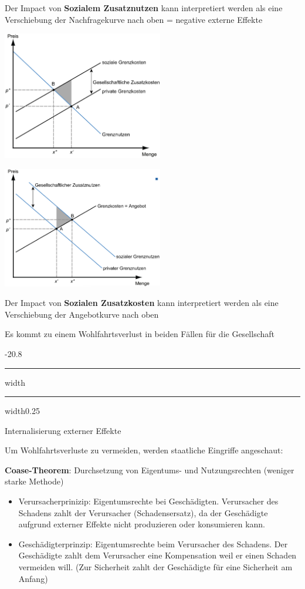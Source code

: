 \documentclass[9pt, landscape, fleqn]{scrartcl}
\makeatletter
\renewcommand{\subsection}{\@startsection{subsection}{1}{0mm}%
{-2\baselineskip}{0.8\baselineskip}%
{\hrule depth 0.2pt width\columnwidth\hrule depth0.75pt
width0.25\columnwidth\vspace*{1.2em}\large\bfseries\rmfamily}}
\makeatother
\begin{document}
\begin{multicols*}{3}
Der Impact von \textbf{Sozialem Zusatznutzen} kann interpretiert werden als eine Verschiebung der Nachfragekurve nach oben = negative externe Effekte

\begin{center}
    \includegraphics[width=7cm]{Negative_Effekte.png}
\end{center}

\begin{center}
    \includegraphics[width=7cm]{Positive_Effekte.png}
\end{center}

Der Impact von \textbf{Sozialen Zusatzkosten} kann interpretiert werden als eine Verschiebung der Angebotkurve nach oben  \newline 

Es kommt zu einem Wohlfahrtsverlust in beiden Fällen für die Gesellschaft 

\subsection{Internalisierung externer Effekte}

Um Wohlfahrtsverluste zu vermeiden, werden staatliche Eingriffe angeschaut: \newline

\textbf{Coase-Theorem}: Durchsetzung von Eigentums- und Nutzungsrechten (weniger starke Methode)

\begin{itemize}
    \item Verursacherprinizip: Eigentumsrechte bei Geschädigten. Verursacher des Schadens zahlt der Verursacher (Schadensersatz), da der Geschädigte aufgrund externer Effekte nicht produzieren oder konsumieren kann.
    \item Geschädigterprinzip: Eigentumsrechte beim Verursacher des Schadens. Der Geschädigte zahlt dem Verursacher eine Kompensation weil er einen Schaden vermeiden will. (Zur Sicherheit zahlt der Geschädigte für eine Sicherheit am Anfang)
\end{itemize}




\end{multicols*}
\end{document}
